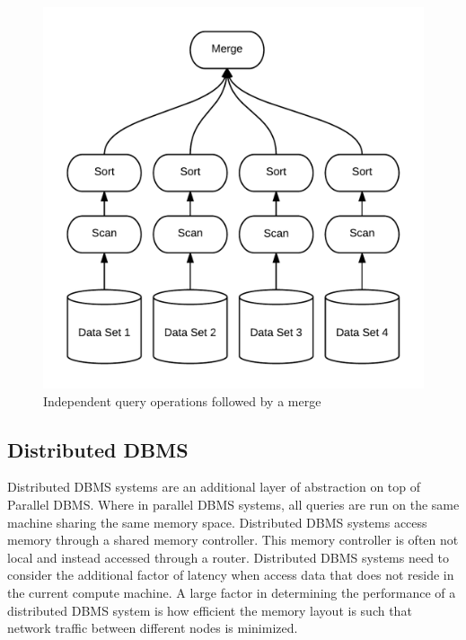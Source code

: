 \documentclass[10pt,twocolumn]{IEEEtran11}
\begin{document}
\begin{figure}[h]
\centering
\includegraphics[scale=0.12]{images/parDBMS.png}
\caption{Independent query operations followed by a merge}
\label{fig:disDBMS}
\end{figure}

\subsection{Distributed DBMS}

Distributed DBMS systems are an additional layer of abstraction on top of Parallel DBMS.  Where in parallel DBMS systems, all queries are run on the same machine sharing the same memory space.  Distributed DBMS systems access memory through a shared memory controller.  This memory controller is often not local and instead accessed through a router.  Distributed DBMS systems need to consider the additional factor of latency when access data that does not reside in the current compute machine.  A large factor in determining the performance of a distributed DBMS system is how efficient the memory layout is such that network traffic between different nodes is minimized. 
\end{document}
